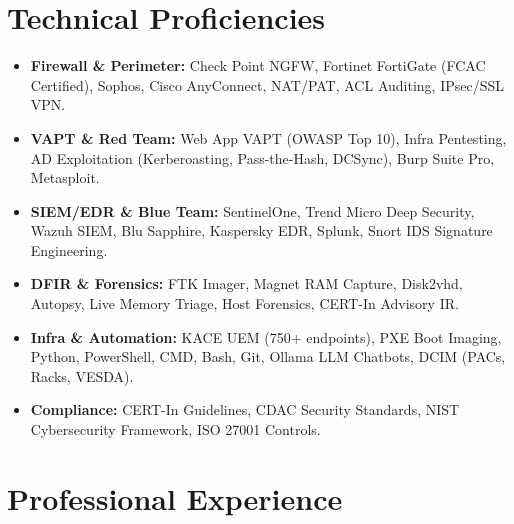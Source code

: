 \documentclass[10pt,a4paper]{article}
\begin{document}
\section{Technical Proficiencies}
\footnotesize
\begin{itemize}[leftmargin=0.1in, label={}, itemsep=1pt, topsep=1pt]
\item \textbf{Firewall \& Perimeter:} Check Point NGFW, Fortinet FortiGate (FCAC Certified), Sophos, Cisco AnyConnect, NAT/PAT, ACL Auditing, IPsec/SSL VPN.
\item \textbf{VAPT \& Red Team:} Web App VAPT (OWASP Top 10), Infra Pentesting, AD Exploitation (Kerberoasting, Pass-the-Hash, DCSync), Burp Suite Pro, Metasploit.
\item \textbf{SIEM/EDR \& Blue Team:} SentinelOne, Trend Micro Deep Security, Wazuh SIEM, Blu Sapphire, Kaspersky EDR, Splunk, Snort IDS Signature Engineering.
\item \textbf{DFIR \& Forensics:} FTK Imager, Magnet RAM Capture, Disk2vhd, Autopsy, Live Memory Triage, Host Forensics, CERT-In Advisory IR.
\item \textbf{Infra \& Automation:} KACE UEM (750+ endpoints), PXE Boot Imaging, Python, PowerShell, CMD, Bash, Git, Ollama LLM Chatbots, DCIM (PACs, Racks, VESDA).
\item \textbf{Compliance:} CERT-In Guidelines, CDAC Security Standards, NIST Cybersecurity Framework, ISO 27001 Controls.
\end{itemize}

\section{Professional Experience}
\end{document}
